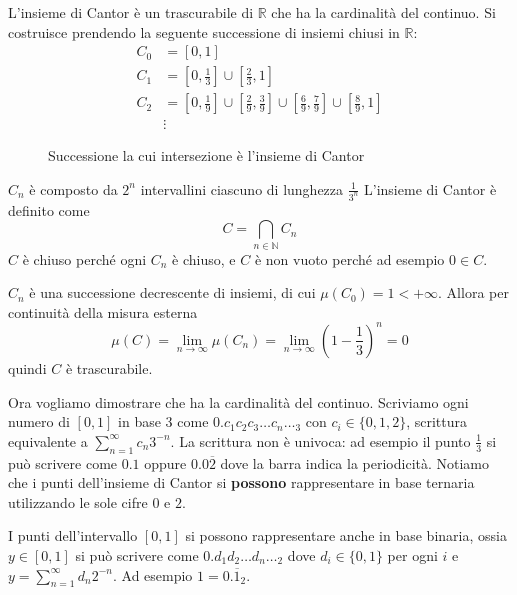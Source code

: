 \begin{example}\label{ex:cantor}
    L'insieme di Cantor è un trascurabile di \(\mathbb{R}\) che ha la cardinalità del continuo.
    Si costruisce prendendo la seguente successione di insiemi chiusi in \(\mathbb{R}\): 
    \begin{align*}
        C_{0} &= [0, 1] \\
        C_{1} &= \left[ 0, \frac{1}{3} \right] \cup \left[ \frac{2}{3}, 1 \right] \\
        C_{2} &= \left[ 0, \frac{1}{9} \right] \cup \left[ \frac{2}{9}, \frac{3}{9} \right] \cup \left[ \frac{6}{9}, \frac{7}{9} \right] \cup \left[ \frac{8}{9}, 1 \right] \\
        &\vdots
    \end{align*}
\begin{figure}[ht]
    \centering
    \caption{Successione la cui intersezione è l'insieme di Cantor}\label{fig:cantor}
\end{figure}
    \(C_{n}\) è composto da \(2^{n}\) intervallini ciascuno di lunghezza
    \(\frac{1}{3^n}\) 
    L'insieme di Cantor è definito come
    \begin{equation}\label{eq:cantor}
        C = \bigcap_{n \in \mathbb{N}} C_{n}
    \end{equation}
    \(C\) è chiuso perché ogni \(C_{n}\) è chiuso, e \(C\) è non vuoto
    perché ad esempio \(0 \in C\).

    \(C_{n}\) è una successione decrescente di insiemi, di cui \(\mu(C_{0}) = 1
    < +\infty\). Allora per continuità della misura esterna
    \[
        \mu(C) = \lim_{n \to \infty} \mu(C_{n}) = \lim_{n \to \infty} {\left( 1 -
    \frac{1}{3} \right)}^{n} = 0
    \]
    quindi \(C\) è trascurabile.

    Ora vogliamo dimostrare che ha la cardinalità del continuo. Scriviamo ogni numero di \([0, 1]\) in base 3
    come \(0.c_{1}c_{2}c_{3}\dots c_{n}\dots_3\) con \(c_{i}\in \{0, 1, 2\}\), scrittura equivalente a \(\sum_{n=1}^{\infty} c_n 3^{-n}\). La scrittura non è univoca: ad esempio il punto
    \(\frac{1}{3}\) si può scrivere come \(0.1\) oppure \(0.0\overline{2}\) dove
    la barra indica la periodicità. Notiamo che i punti dell'insieme di
    Cantor si \textbf{possono} rappresentare in base ternaria utilizzando le sole cifre
    \(0\) e \(2\).

    I punti dell'intervallo \([0, 1]\) si possono rappresentare
    anche in base binaria, ossia \(y \in [0, 1]\) si può scrivere come
    \(0.d_{1}d_{2}\dots d_{n} \dots_2\) dove \(d_{i} \in \{0, 1\}\) per ogni
    \(i\) e \(y = \sum_{n=1}^{\infty} d_{n} 2^{-n} \). Ad esempio \(1 =
    0.\overline{1}_2\).


\end{example}
